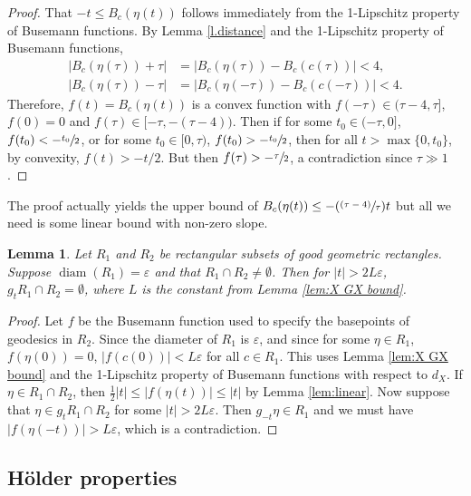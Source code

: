 \documentclass[JEP,XML,SOM,Unicode,NoFloatCountersInSection]{cedram}
\let\epsilon\varepsilon
\newcommand{\Ppsfrac}[2]{(\sfrac{(#1)}{#2})}
\newtheorem{lem}[thm]{Lemma}
\theoremstyle{definition}
\numberwithin{equation}{section}
\DeclareMathOperator{\diam}{diam}
\begin{document}
\begin{proof}
That $-t \leq B_{c}(\eta(t))$ follows immediately from the 1-Lipschitz property of Busemann functions. By Lemma \ref{l.distance} and the 1-Lipschitz property of Busemann functions,
\begin{align*}
|B_{c}(\eta(\tau)) + \tau | &= | B_{c}(\eta(\tau)) - B_{c}(c(\tau)) | < 4,\\ \tag*{and similarly} |B_{c}(\eta(\tau)) - \tau | &= | B_{c}(\eta(-\tau)) - B_{c}(c(-\tau)) | < 4. 
\end{align*}
Therefore, $f(t) = B_{c}(\eta(t))$ is a convex function with $f(-\tau)\in (\tau-4,\tau]$, $f(0)=0$ and $f(\tau) \in [-\tau,-(\tau-4))$. Then if for some $t_0 \in (-\tau,0]$, $f(t_0) < -\sfrac{t_0}{2}$, or for some $t_0 \in [0,\tau)$, $f(t_0)>-\sfrac{t_0}{2}$, then for all $t>\max\{0,t_0\}$, by convexity, $f(t) > -t/2$. But then $f(\tau) > -\sfrac{\tau}{2}$, a contradiction since $\tau\gg 1$.
\end{proof}

The proof actually yields the upper bound of $B_{c}(\eta(t)) \leq - \Ppsfrac{\tau-4}{\tau} t$ but all we need is some linear bound with non-zero slope.

\begin{lem}\label{lem:deform tool}
Let $R_1$ and $R_2$ be rectangular subsets of good geometric rectangles. Suppose $\diam(R_1) = \epsilon$ and that $R_1 \cap R_2 \neq \emptyset$. Then for $|t|>2L\epsilon$, $g_tR_1 \cap R_2 = \emptyset$, where $L$ is the constant from Lemma \ref{lem:X GX bound}.
\end{lem}

\begin{proof}
Let $f$ be the Busemann function used to specify the basepoints of geodesics in $R_2$. Since the diameter of $R_1$ is $\epsilon$, and since for some $\eta\in R_1$, $f(\eta(0))=0$, $|f(c(0))| < L\epsilon$ for all $c\in R_1$. This uses Lemma \ref{lem:X GX bound} and the 1-Lipschitz property of Busemann functions with respect to $d_X$. If $\eta \in R_1 \cap R_2$, then $\frac{1}{2}|t| \leq |f(\eta(t))| \leq |t|$ by Lemma \ref{lem:linear}. Now suppose that $\eta \in g_tR_1 \cap R_2$ for some $|t|>2L\epsilon$. Then $g_{-t}\eta \in R_1$ and we must have $|f(\eta(-t))| > L\epsilon$, which is a contradiction.
\end{proof}

\subsection{Hölder properties}
\end{document}
